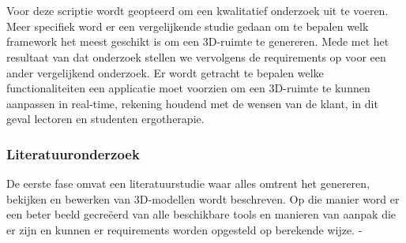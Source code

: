 
\chapter{}%
\label{ch:methodologie}

Voor deze scriptie wordt geopteerd om een kwalitatief onderzoek uit te voeren. Meer specifiek word er een vergelijkende studie gedaan om te bepalen welk framework het meest geschikt is om een 3D-ruimte te genereren. Mede met het resultaat van dat onderzoek stellen we vervolgens de requirements op voor een ander vergelijkend onderzoek.
Er wordt getracht te bepalen welke functionaliteiten een applicatie moet voorzien om een 3D-ruimte te kunnen aanpassen in real-time, rekening houdend met de wensen van de klant, in dit geval lectoren en studenten ergotherapie.

\subsection{Literatuuronderzoek}

 De eerste fase omvat een literatuurstudie waar alles omtrent het genereren, bekijken en bewerken van 3D-modellen wordt beschreven. Op die manier word er een beter beeld gecreëerd van alle beschikbare tools en manieren van aanpak die er zijn en kunnen er requirements worden opgesteld op berekende wijze.
-

